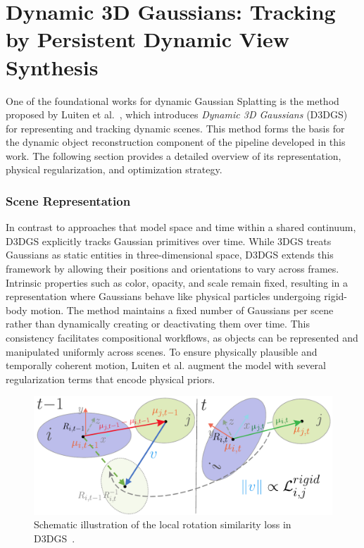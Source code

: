 \section{Dynamic 3D Gaussians: Tracking by Persistent Dynamic View Synthesis}

One of the foundational works for dynamic Gaussian Splatting is the method proposed by Luiten et al.~\cite{luiten2024dynamic}, which introduces \textit{Dynamic 3D Gaussians} (D3DGS) for representing and tracking dynamic scenes. 
This method forms the basis for the dynamic object reconstruction component of the pipeline developed in this work. 
The following section provides a detailed overview of its representation, physical regularization, and optimization strategy.

\subsubsection{Scene Representation}

In contrast to approaches that model space and time within a shared continuum, D3DGS explicitly tracks Gaussian primitives over time. 
While 3DGS treats Gaussians as static entities in three-dimensional space, D3DGS extends this framework by allowing their positions and orientations to vary across frames. 
Intrinsic properties such as color, opacity, and scale remain fixed, resulting in a representation where Gaussians behave like physical particles undergoing rigid-body motion. 
The method maintains a fixed number of Gaussians per scene rather than dynamically creating or deactivating them over time. 
This consistency facilitates compositional workflows, as objects can be represented and manipulated uniformly across scenes. 
To ensure physically plausible and temporally coherent motion, Luiten et al. augment the model with several regularization terms that encode physical priors.

\begin{figure}[ht]
    \centering
    \includegraphics[width=\textwidth]{Grafiken/Fundamentals/loss_fig_luiten.pdf}
    \caption{Schematic illustration of the local rotation similarity loss in D3DGS~\cite{luiten2024dynamic}.}
    \label{fig:loss_fig_luiten}
\end{figure}

